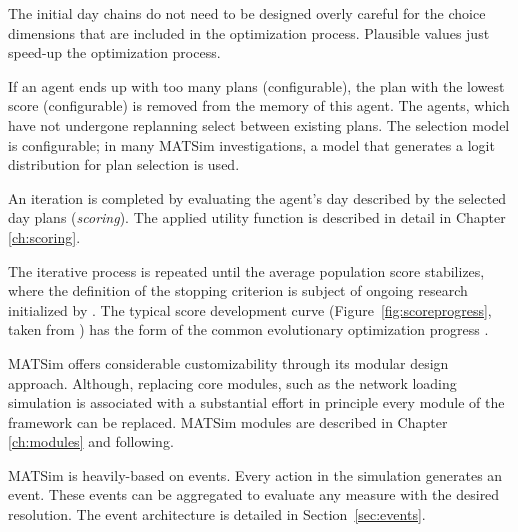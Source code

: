 The initial day chains do not need to be designed overly careful for the choice dimensions that are included in the optimization process. Plausible values just speed-up the optimization process. 

If an agent ends up with too many plans (configurable), the plan with the lowest score (configurable) is removed from the memory of this agent. The agents, which have not undergone replanning select between existing plans. The selection model is configurable; in many MATSim investigations, a model that generates a logit distribution for plan selection is used.

An iteration is completed by evaluating the agent's day described by the selected day plans (\emph{scoring}). The applied utility function is described in detail in Chapter \ref{ch:scoring}.

The iterative process is repeated until the average population score stabilizes, where the definition of the stopping criterion is subject of ongoing research initialized by \citet[][]{Meister_PhDThesis_2011, NagelFloetteroed_IATBR_2009}. The typical score development curve (Figure~\ref{fig:scoreprogress}, taken from \citet[][]{HorniEtAl_TRR_2009}) has the form of the common evolutionary optimization progress \citep[][p.]{EibenSmithJE_2003}.

MATSim offers considerable customizability through its modular design approach. Although, replacing core modules, such as the network loading simulation is associated with a substantial effort \citep[][Section 2.4]{MATSim_Userguide_2014} in principle every module of the framework can be replaced. MATSim modules are described in Chapter \ref{ch:modules} and following.

MATSim is heavily-based on events. Every action in the simulation generates an event. These events can be aggregated to evaluate any measure with the desired resolution. The event architecture is detailed in Section~\ref{sec:events}.

